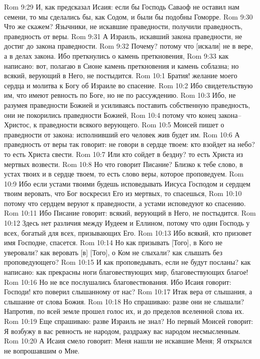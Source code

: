 Rom 9:29  И, как предсказал Исаия: если бы Господь Саваоф не оставил нам семени, то мы сделались бы, как Содом, и были бы подобны Гоморре.
Rom 9:30  Что же скажем? Язычники, не искавшие праведности, получили праведность, праведность от веры.
Rom 9:31  А Израиль, искавший закона праведности, не достиг до закона праведности.
Rom 9:32  Почему? потому что [искали] не в вере, а в делах закона. Ибо преткнулись о камень преткновения,
Rom 9:33  как написано: вот, полагаю в Сионе камень преткновения и камень соблазна; но всякий, верующий в Него, не постыдится.
Rom 10:1  Братия! желание моего сердца и молитва к Богу об Израиле во спасение.
Rom 10:2  Ибо свидетельствую им, что имеют ревность по Боге, но не по рассуждению.
Rom 10:3  Ибо, не разумея праведности Божией и усиливаясь поставить собственную праведность, они не покорились праведности Божией,
Rom 10:4  потому что конец закона--Христос, к праведности всякого верующего.
Rom 10:5  Моисей пишет о праведности от закона: исполнивший его человек жив будет им.
Rom 10:6  А праведность от веры так говорит: не говори в сердце твоем: кто взойдет на небо? то есть Христа свести.
Rom 10:7  Или кто сойдет в бездну? то есть Христа из мертвых возвести.
Rom 10:8  Но что говорит Писание? Близко к тебе слово, в устах твоих и в сердце твоем, то есть слово веры, которое проповедуем.
Rom 10:9  Ибо если устами твоими будешь исповедывать Иисуса Господом и сердцем твоим веровать, что Бог воскресил Его из мертвых, то спасешься,
Rom 10:10  потому что сердцем веруют к праведности, а устами исповедуют ко спасению.
Rom 10:11  Ибо Писание говорит: всякий, верующий в Него, не постыдится.
Rom 10:12  Здесь нет различия между Иудеем и Еллином, потому что один Господь у всех, богатый для всех, призывающих Его.
Rom 10:13  Ибо всякий, кто призовет имя Господне, спасется.
Rom 10:14  Но как призывать [Того], в Кого не уверовали? как веровать [в] [Того], о Ком не слыхали? как слышать без проповедующего?
Rom 10:15  И как проповедывать, если не будут посланы? как написано: как прекрасны ноги благовествующих мир, благовествующих благое!
Rom 10:16  Но не все послушались благовествования. Ибо Исаия говорит: Господи! кто поверил слышанному от нас?
Rom 10:17  Итак вера от слышания, а слышание от слова Божия.
Rom 10:18  Но спрашиваю: разве они не слышали? Напротив, по всей земле прошел голос их, и до пределов вселенной слова их.
Rom 10:19  Еще спрашиваю: разве Израиль не знал? Но первый Моисей говорит: Я возбужу в вас ревность не народом, раздражу вас народом несмысленным.
Rom 10:20  А Исаия смело говорит: Меня нашли не искавшие Меня; Я открылся не вопрошавшим о Мне.
